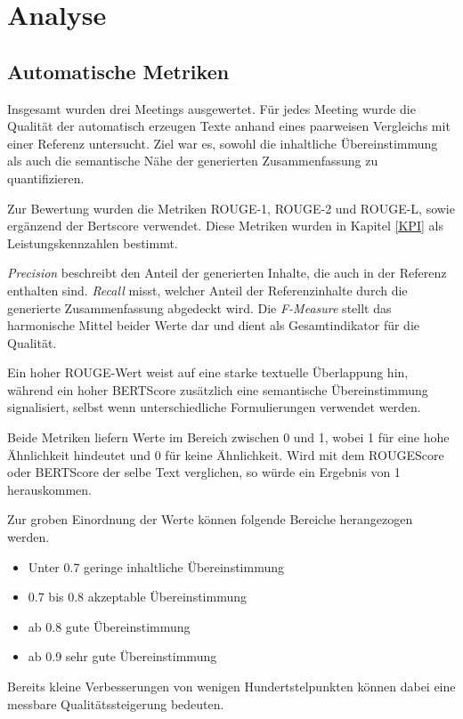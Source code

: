 \section{Analyse}
\subsection{Automatische Metriken}
Insgesamt wurden drei Meetings ausgewertet. Für jedes Meeting wurde die Qualität der automatisch erzeugen Texte anhand eines paarweisen Vergleichs mit einer Referenz untersucht. Ziel war es, sowohl die inhaltliche Übereinstimmung als auch die semantische Nähe der generierten Zusammenfassung zu quantifizieren. 

Zur Bewertung wurden die Metriken ROUGE-1, ROUGE-2 und ROUGE-L, sowie ergänzend der Bertscore verwendet. Diese Metriken wurden in Kapitel \ref{KPI} als Leistungskennzahlen bestimmt. 

\textit{Precision} beschreibt den Anteil der generierten Inhalte, die auch in der Referenz enthalten sind. \textit{Recall} misst, welcher Anteil der Referenzinhalte durch die generierte Zusammenfassung abgedeckt wird. Die \textit{F-Measure} stellt das harmonische Mittel beider Werte dar und dient als Gesamtindikator für die Qualität. 

Ein hoher ROUGE-Wert weist auf eine starke textuelle Überlappung hin, während ein hoher BERTScore zusätzlich eine semantische Übereinstimmung signalisiert, selbst wenn unterschiedliche Formulierungen verwendet werden.

Beide Metriken liefern Werte im Bereich zwischen 0 und 1, wobei 1 für eine hohe Ähnlichkeit hindeutet und 0 für keine Ähnlichkeit. Wird mit dem ROUGEScore oder BERTScore der selbe Text verglichen, so würde ein Ergebnis von 1 herauskommen. 

Zur groben Einordnung der Werte können folgende Bereiche herangezogen werden. 

\begin{itemize}
    \item Unter 0.7 geringe inhaltliche Übereinstimmung
    \item 0.7 bis 0.8 akzeptable Übereinstimmung
    \item ab 0.8 gute Übereinstimmung
    \item ab 0.9 sehr gute Übereinstimmung    
\end{itemize}

Bereits kleine Verbesserungen von wenigen Hundertstelpunkten können dabei eine messbare Qualitätssteigerung bedeuten.

